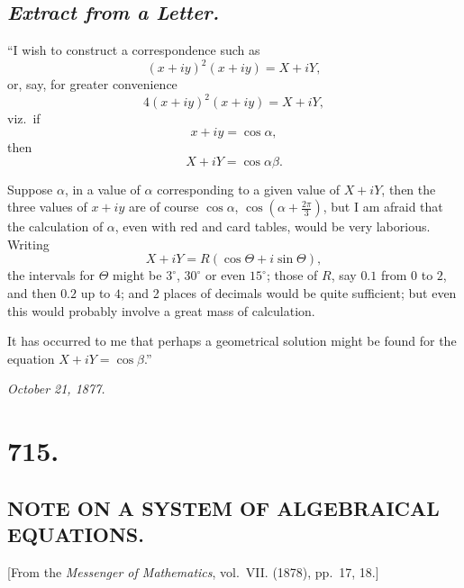 \documentclass[11pt,a4paper]{book}
\begin{document}
\subsection*{\textit{Extract from a Letter.}}

``I wish to construct a correspondence such as
\[
(x+iy)^2(x+iy)=X+iY,
\]
or, say, for greater convenience
\[
4(x+iy)^2(x+iy)=X+iY,
\]
viz.\ if
\[
x+iy=\cos\alpha,
\]
then
\[
X+iY=\cos\alpha\beta.
\]

Suppose $\alpha$, in a value of $\alpha$ corresponding to a given value of $X+iY$, then the three values of $x+iy$ are of course $\cos\alpha$, $\cos\left(\alpha+\frac{2\pi}{3}\right)$, but I am afraid that the calculation of $\alpha$, even with red and card tables, would be very laborious. Writing
\[
X+iY=R(\cos\Theta+i\sin\Theta),
\]
the intervals for $\Theta$ might be $3^\circ$, $30^\circ$ or even $15^\circ$; those of $R$, say $0.1$ from $0$ to $2$, and then $0.2$ up to $4$; and 2 places of decimals would be quite sufficient; but even this would probably involve a great mass of calculation.

It has occurred to me that perhaps a geometrical solution might be found for the equation $X+iY=\cos\beta$.''

\hfill\textit{October 21, 1877.}

\vspace{2em}
\noindent\dotfill

\newpage
\section*{715.}
\subsection*{NOTE ON A SYSTEM OF ALGEBRAICAL EQUATIONS.}

\begin{center}
\small [From the \textit{Messenger of Mathematics}, vol.~VII. (1878), pp.~17, 18.]
\end{center}

\medskip
\end{document}
